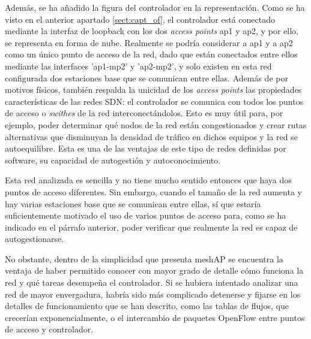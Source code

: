 \documentclass[a4paper,12pt,twoside,spanish]{book}
\begin{document}
Además, se ha añadido la figura del controlador en la representación. Como se ha visto en el anterior apartado \ref{sect:capt_of}, el controlador está conectado mediante la interfaz de loopback con los dos \textit{access points} ap1 y ap2, y por ello, se representa en forma de nube. Realmente se podría considerar a ap1 y a ap2 como un único punto de acceso de la red, dado que están conectados entre ellos mediante las interfaces 'ap1-mp2' y 'ap2-mp2', y solo existen en esta red configurada dos estaciones base que se comunican entre ellas. Además de por motivos físicos, también respalda la unicidad de los \textit{access points} las propiedades características de las redes SDN: el controlador se comunica con todos los puntos de acceso o \textit{swithes} de la red interconectándolos. Esto es muy útil para, por ejemplo, poder determinar qué nodos de la red están congestionados y crear rutas alternativas que disminuyan la densidad de tráfico en dichos equipos y la red se autoequilibre. Esta es una de las ventajas de este tipo de redes definidas por software, su capacidad de autogestión y autoconocimiento.\par 

Esta red analizada es sencilla y no tiene mucho sentido entonces que haya dos puntos de acceso diferentes. Sin embargo, cuando el tamaño de la red aumenta y hay varias estaciones base que se comunican entre ellas, sí que estaría suficientemente motivado el uso de varios puntos de acceso para, como se ha indicado en el párrafo anterior, poder verificar que realmente la red es capaz de autogestionarse. \par 

No obstante, dentro de la simplicidad que presenta meshAP se encuentra la ventaja de haber permitido conocer con mayor grado de detalle cómo funciona la red y qué tareas desempeña el controlador. Si se hubiera intentado analizar una red de mayor envergadura, habría sido más complicado detenerse y fijarse en los detalles de funcionamiento que se han descrito, como las tablas de flujos, que crecerían exponencialmente, o el intercambio de paquetes OpenFlow entre puntos de acceso y controlador.\par
\end{document}

